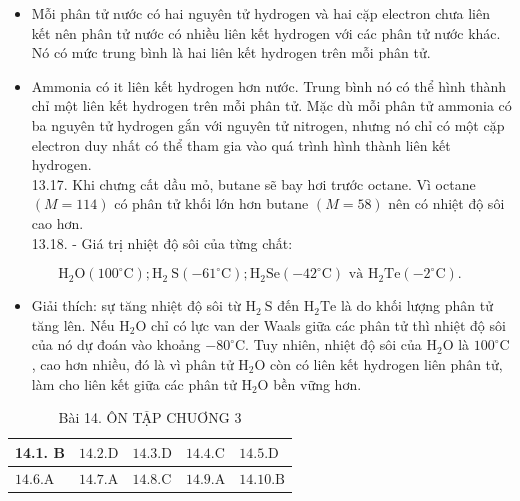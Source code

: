 \documentclass[10pt]{article}
\begin{document}
\begin{itemize}
  \item Mỗi phân tử nước có hai nguyên tử hydrogen và hai cặp electron chưa liên kết nên phân tử nước có nhiều liên kết hydrogen với các phân tử nước khác. Nó có mức trung bình là hai liên kết hydrogen trên mỗi phân tử.
  \item Ammonia có it liên kết hydrogen hơn nước. Trung bình nó có thể hình thành chỉ một liên kết hydrogen trên mỗi phân tử. Mặc dù mỗi phân tử ammonia có ba nguyên tử hydrogen gắn với nguyên tử nitrogen, nhưng nó chỉ có một cặp electron duy nhất có thể tham gia vào quá trình hình thành liên kết hydrogen.\\
13.17. Khi chưng cất dầu mỏ, butane sẽ bay hơi trước octane. Vì octane $(M=114)$ có phân tử khối lớn hơn butane $(M=58)$ nên có nhiệt độ sôi cao hơn.\\
13.18. - Giá trị nhiệt độ sôi của từng chất:
\end{itemize}

$$
\mathrm{H}_{2} \mathrm{O}\left(100^{\circ} \mathrm{C}\right) ; \mathrm{H}_{2} \mathrm{~S}\left(-61^{\circ} \mathrm{C}\right) ; \mathrm{H}_{2} \mathrm{Se}\left(-42^{\circ} \mathrm{C}\right) \text { và } \mathrm{H}_{2} \mathrm{Te}\left(-2^{\circ} \mathrm{C}\right) .
$$

\begin{itemize}
  \item Giải thích: sự tăng nhiệt độ sôi từ $\mathrm{H}_{2} \mathrm{~S}$ đến $\mathrm{H}_{2} \mathrm{Te}$ là do khối lượng phân tử tăng lên. Nếu $\mathrm{H}_{2} \mathrm{O}$ chỉ có lực van der Waals giữa các phân tử thì nhiệt độ sôi của nó dự đoán vào khoảng $-80^{\circ} \mathrm{C}$. Tuy nhiên, nhiệt độ sôi của $\mathrm{H}_{2} \mathrm{O}$ là $100^{\circ} \mathrm{C}$, cao hơn nhiều, đó là vì phân tử $\mathrm{H}_{2} \mathrm{O}$ còn có liên kết hydrogen liên phân tử, làm cho liên kết giữa các phân tử $\mathrm{H}_{2} \mathrm{O}$ bền vững hơn.
\end{itemize}

\begin{table}[h]
\begin{center}
\captionsetup{labelformat=empty}
\caption{Bài 14. ÔN TẬP CHUƠNG 3}
\begin{tabular}{|l|l|l|l|l|}
\hline
14.1. B & $14.2 . \mathrm{D}$ & $14.3 . \mathrm{D}$ & $14.4 . \mathrm{C}$ & $14.5 . \mathrm{D}$ \\
\hline
$14.6 . \mathrm{A}$ & $14.7 . \mathrm{A}$ & $14.8 . \mathrm{C}$ & $14.9 . \mathrm{A}$ & $14.10 . \mathrm{B}$ \\
\hline
\end{tabular}
\end{center}
\end{table}
\end{document}
